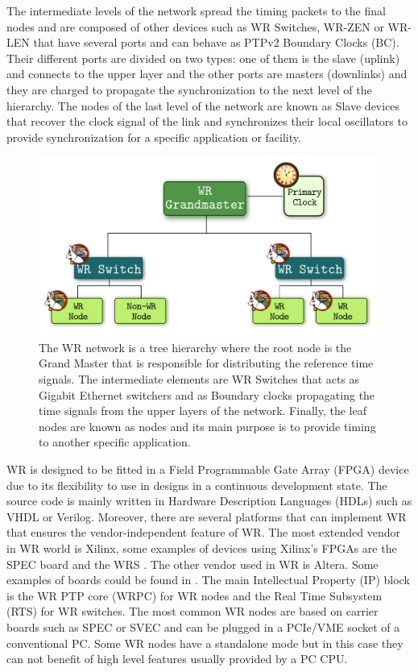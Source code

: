 The intermediate levels of the network spread the timing packets to the final nodes and are composed of other devices such as WR Switches, WR-ZEN or WR-LEN that have several ports and can behave as PTPv2 Boundary Clocks (BC). Their different ports are divided on two types: one of them is the slave (uplink) and connects to the upper layer and the other ports are masters (downlinks) and they are charged to propagate the synchronization to the next level of the hierarchy. The nodes of the last level of the network are known as Slave devices that recover the clock signal of the link and synchronizes their local oscillators to provide synchronization for a specific application or facility.

\begin{figure}[H]
	\centering
	\includegraphics[scale=0.4]{img/wr_hierarchy}
	\caption{The WR network is a tree hierarchy where the root node is the Grand Master that is responsible for distributing the reference time signals. The intermediate elements are WR Switches that acts as Gigabit Ethernet switchers and as Boundary clocks propagating the time signals from the upper layers of the network. Finally, the leaf nodes are known as nodes and its main purpose is to provide timing to another specific application.}
	\label{fig:wr_hierarchy}
\end{figure}


WR is designed to be fitted in a Field Programmable Gate Array (FPGA) device due to its flexibility to use in designs in a continuous development state. The source code is mainly written in Hardware Description Languages (HDLs) such as VHDL or Verilog. Moreover, there are several platforms that can implement WR that ensures the vendor-independent feature of WR. The most extended vendor in WR world is Xilinx, some examples of devices using Xilinx's FPGAs are the SPEC board \cite{ohwr:spec} and the WRS \cite{ohwr:wrs}. The other vendor used in WR is Altera. Some examples of boards could be found in \cite{cesar-altera-wr}. The main Intellectual Property (IP) block is the WR PTP core (WRPC) for WR nodes and the Real Time Subsystem (RTS) for WR switches. The most common WR nodes are based on carrier boards such as SPEC or SVEC and can be plugged in a PCIe/VME socket of a conventional PC. Some WR nodes have a standalone mode but in this case they can not benefit of high level features usually provided by a PC CPU.

